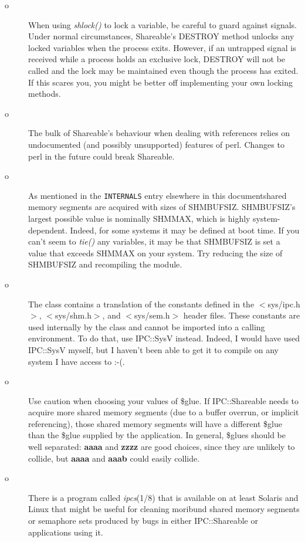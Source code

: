 \begin{description}

\item[o]
When using {\em shlock()\/} to lock a variable, be careful to guard against
signals.  Under normal circumstances, Shareable's DESTROY method
unlocks any locked variables when the process exits.  However, if an
untrapped signal is received while a process holds an exclusive lock,
DESTROY will not be called and the lock may be maintained even though
the process has exited.  If this scares you, you might be better off
implementing your own locking methods.

\item[o]
The bulk of Shareable's behaviour when dealing with references relies
on undocumented (and possibly unsupported) features of perl.  Changes
to perl in the future could break Shareable.

\item[o]
As mentioned in the {\tt INTERNALS} entry elsewhere in this documentshared memory segments are acquired
with sizes of SHM\underscore{}BUFSIZ.  SHM\underscore{}BUFSIZ's largest possible value is
nominally SHMMAX, which is highly system-dependent.  Indeed, for some
systems it may be defined at boot time.  If you can't seem to {\em tie()\/}
any variables, it may be that SHM\underscore{}BUFSIZ is set a value that exceeds
SHMMAX on your system.  Try reducing the size of SHM\underscore{}BUFSIZ and
recompiling the module.

\item[o]
The class contains a translation of the constants defined in the
$<$sys/ipc.h$>$, $<$sys/shm.h$>$, and $<$sys/sem.h$>$ header files.  These
constants are used internally by the class and cannot be imported into
a calling environment.  To do that, use IPC::SysV instead.  Indeed, I
would have used IPC::SysV myself, but I haven't been able to get it to
compile on any system I have access to :-(.

\item[o]
Use caution when choosing your values of \$glue.  If IPC::Shareable
needs to acquire more shared memory segments (due to a buffer overrun,
or implicit referencing), those shared memory segments will have a
different \$glue than the \$glue supplied by the application.  In
general, \$glues should be well separated: {\bf aaaa} and {\bf zzzz} are good
choices, since they are unlikely to collide, but {\bf aaaa} and {\bf aaab}
could easily collide.

\item[o]
There is a program called {\em ipcs\/}(1/8) that is available on at least
Solaris and Linux that might be useful for cleaning moribund shared
memory segments or semaphore sets produced by bugs in either
IPC::Shareable or applications using it.


\end{description}
